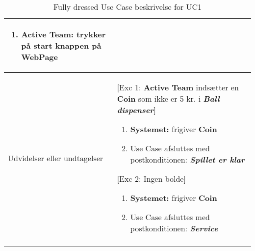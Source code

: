 \documentclass[Kravspecifikation/Kravspec_Main.tex]{subfiles}
\begin{document}
\begin{longtable}[]{@{}ll@{}}
\begin{minipage}[t]{0.47\columnwidth}
\begin{enumerate}
\item
  {\textbf{Active Team:} trykker på start knappen på WebPage}
\end{enumerate}\strut
\end{minipage}\tabularnewline
\toprule
\begin{minipage}[t]{0.47\columnwidth}\raggedright
{Udvidelser eller undtagelser}\strut
\end{minipage} & \begin{minipage}[t]{0.47\columnwidth}\raggedright
{[Exc 1: \textbf{Active Team} indsætter en \textbf{Coin} som ikke er 5 kr. i \textit{\textbf{Ball dispenser}}]}
\begin{enumerate}
\tightlist
\item \textbf{Systemet:} frigiver \textbf{Coin}
\item Use Case afsluttes med postkonditionen:  \textbf{\textit{Spillet er klar}}
\end{enumerate}
{[Exc 2: Ingen bolde]}
\begin{enumerate}
\tightlist
\item \textbf{Systemet:} frigiver \textbf{Coin}
\item Use Case afsluttes med postkonditionen:  \textbf{\textit{Service}}
\end{enumerate}
{}\strut
\end{minipage}\tabularnewline
\bottomrule
\bottomrule
\caption{Fully dressed Use Case beskrivelse for UC1}
\label{tab:UC1}
\end{longtable}
\end{document}
